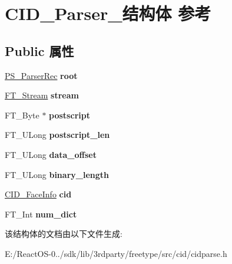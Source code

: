 \hypertarget{struct_c_i_d___parser__}{}\section{C\+I\+D\+\_\+\+Parser\+\_\+结构体 参考}
\label{struct_c_i_d___parser__}
\subsection*{Public 属性}
\begin{DoxyCompactItemize}
\item 
\mbox{\label{struct_c_i_d___parser___a0c9738e99dc311693c92b64c238fc88f}} 
\hyperlink{struct_p_s___parser_rec__}{P\+S\+\_\+\+Parser\+Rec} {\bfseries root}
\item 
\mbox{\label{struct_c_i_d___parser___a4012b4fa2613959368e49e2aea7f5f15}} 
\hyperlink{struct_f_t___stream_rec__}{F\+T\+\_\+\+Stream} {\bfseries stream}
\item 
\mbox{\label{struct_c_i_d___parser___a16eecdbccfcd10ae152f67a29a95862f}} 
F\+T\+\_\+\+Byte $\ast$ {\bfseries postscript}
\item 
\mbox{\label{struct_c_i_d___parser___a735f47b0f4cca133f8f472ffd64308e3}} 
F\+T\+\_\+\+U\+Long {\bfseries postscript\+\_\+len}
\item 
\mbox{\label{struct_c_i_d___parser___a496dcfa877b287a79387f0b1752af680}} 
F\+T\+\_\+\+U\+Long {\bfseries data\+\_\+offset}
\item 
\mbox{\label{struct_c_i_d___parser___aaf16effa1729504fe390407838c1ac0d}} 
F\+T\+\_\+\+U\+Long {\bfseries binary\+\_\+length}
\item 
\mbox{\label{struct_c_i_d___parser___a6f50436242a6b2fd48d278887665cd83}} 
\hyperlink{struct_c_i_d___face_info_rec__}{C\+I\+D\+\_\+\+Face\+Info} {\bfseries cid}
\item 
\mbox{\label{struct_c_i_d___parser___a20f8a481494f8b5ddf0d745230faaa87}} 
F\+T\+\_\+\+Int {\bfseries num\+\_\+dict}
\end{DoxyCompactItemize}


该结构体的文档由以下文件生成\+:\begin{DoxyCompactItemize}
\item 
E\+:/\+React\+O\+S-\/0../sdk/lib/3rdparty/freetype/src/cid/cidparse.\+h\end{DoxyCompactItemize}
